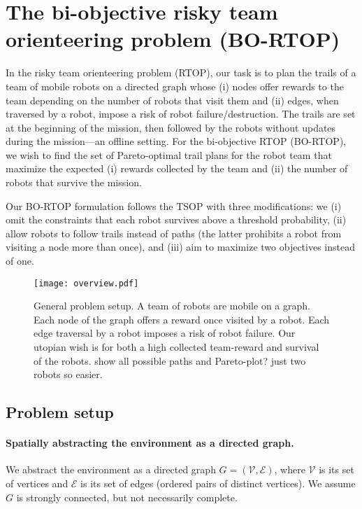 \documentclass[11pt, oneside]{article}
\begin{document}
\section{The bi-objective risky team orienteering problem (BO-RTOP)}
In the risky team orienteering problem (RTOP), our task is to plan the trails of a team of mobile robots on a directed graph whose (i) nodes offer rewards to the team depending on the number of robots that visit them and (ii) edges, when traversed by a robot, impose a risk of robot failure/destruction.
The trails are set at the beginning of the mission, then followed by the robots without updates during the mission---an offline setting. 
For the bi-objective RTOP (BO-RTOP), we wish to find the set of Pareto-optimal trail plans for the robot team that maximize the expected (i) rewards collected by the team and (ii) the number of robots that survive the mission.

Our BO-RTOP formulation follows the TSOP \cite{jorgensen2018team} with three modifications: we (i) omit the constraints that each robot survives above a threshold probability, (ii) allow robots to follow trails instead of paths (the latter prohibits a robot from visiting a node more than once), and (iii) aim to maximize two objectives instead of one.


\begin{figure}[h!]
    \centering
    \texttt{[image: overview.pdf]}
    \caption{
       General problem setup. A team of robots are mobile on a graph. Each node of the graph offers a reward once visited by a robot. Each edge traversal by a robot imposes a risk of robot failure. Our utopian wish is for both a high collected team-reward and survival of the robots. {\color{red} show all possible paths and Pareto-plot? just two robots so easier.}
    }
    \label{fig:overview}
\end{figure}


\subsection{Problem setup}


\paragraph{Spatially abstracting the environment as a directed graph.}
We abstract the environment as a directed graph $G=(\mathcal{V}, \mathcal{E})$, where $\mathcal{V}$ is its set of vertices and $\mathcal{E}$ is its set of edges (ordered pairs of distinct vertices). We assume $G$ is strongly connected, but not necessarily complete.
\end{document}
